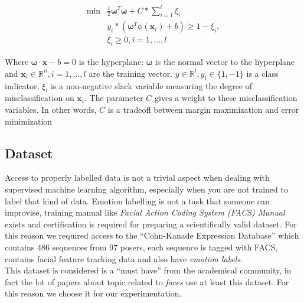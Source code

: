  \begin{align}
   \min & \frac{1}{2} \boldsymbol{\omega}^T \boldsymbol{\omega} + C*\sum_{i=1}^l \xi_i\\
   & y_i * (\boldsymbol{\omega}^T \phi(\textbf{x}_i) + b) \geq 1 - \xi_i,\\
   & \xi_i \geq 0, i = 1, \dots, l
   \label{mt:lin_svm}
 \end{align}
 
 Where $\boldsymbol{\omega} \cdot \textbf{x} - b = 0$ is the hyperplane:
 $\boldsymbol{\omega}$ is the normal vector to the hyperplane and $\textbf{x}_i
 \in \mathbb{R}^n, i = 1,\dots,l$ are the training vector.  $y \in \mathbb{R}^l,
 y_i \in \{1, -1\}$ is a class indicator, $\xi_i$ is a non-negative slack
 variable measuring the degree of misclassification on $\textbf{x}_i$. The
 parameter $C$ gives a weight to these misclassification variables. In other
 words, $C$ is a tradeoff between margin maximization and error minimization

\subsection{Dataset}

Access to properly labelled data is not a trivial aspect when dealing with supervised machine learning algorithm, especially when you are not trained to label that kind of data. Emotion labelling is not a task that someone can improvise, training manual like \emph{Facial Action Coding System (FACS) Manual} exists and certification is required for preparing a scientifically valid dataset. For this reason we required access to the ``Cohn-Kanade Expression Database''\cite{Kanade2000} which contains 486 sequences from 97 posers, each sequence is tagged with FACS, contains facial feature tracking data and also have \emph{emotion labels}. \\

This dataset is considered is a ``must have'' from the academical community, in fact the lot of papers about topic related to \emph{faces} use at least this dataset. For this reason we choose it for our experimentation. 


